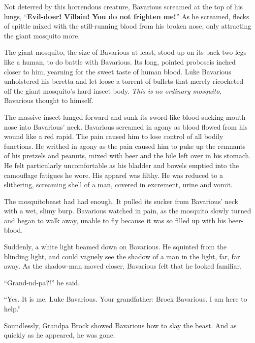 Not deterred by this horrendous creature, Bavarious screamed at the
top of his lungs, ``{\bf Evil-doer! Villain! You do not frighten
me!}'' As he screamed, flecks of spittle mixed with the
still-running blood from his broken nose, only attracting the giant
mosquito more.



The giant mosquito, the size of Bavarious at least, stood up on its
back two legs like a human, to do battle with Bavarious. Its long,
pointed proboscis inched closer to him, yearning for the sweet
taste of human blood. Luke Bavarious unholstered his beretta and
let loose a torrent of bullets that merely ricocheted off the giant
mosquito's hard insect body. {\em This is no ordinary
mosquito}, Bavarious thought to himself.



The massive insect lunged forward and sunk its sword-like
blood-sucking mouth-nose into Bavarious' neck. Bavarious
screamed in agony as blood flowed from his wound like a red rapid.
The pain caused him to lose control of all bodily functions. He
writhed in agony as the pain caused him to puke up the remnants of
his pretzels and peanuts, mixed with beer and the bile left over in
his stomach. He felt particularly uncomfortable as his bladder and
bowels emptied into the camouflage fatigues he wore. His apparel
was filthy. He was reduced to a slithering, screaming shell of a
man, covered in excrement, urine and vomit.



The mosquitobeast had had enough. It pulled its sucker from
Bavarious' neck with a wet, slimy burp. Bavarious watched in
pain, as the mosquito slowly turned and began to walk away, unable
to fly because it was so filled up with his beer-blood.



Suddenly, a white light beamed down on Bavarious. He squinted from
the blinding light, and could vaguely see the shadow of a man in
the light, far, far away. As the shadow-man moved closer, Bavarious
felt that he looked familiar.



``Grand-nd-pa?!'' he said.



``Yes. It is me, Luke Bavarious. Your grandfather: Brock
Bavarious. I am here to help.''



Soundlessly, Grandpa Brock showed Bavarious how to slay the beast.
And as quickly as he appeared, he was gone.



